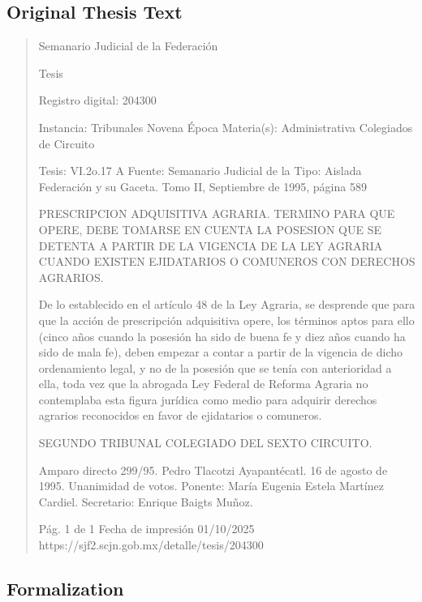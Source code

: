 \documentclass[11pt,a4paper]{article}
\begin{document}
\subsection{Original Thesis Text}

\begin{quote}
                                                   Semanario Judicial de la Federación

                                                  Tesis

 Registro digital: 204300

 Instancia: Tribunales            Novena Época                         Materia(s): Administrativa
 Colegiados de Circuito

 Tesis: VI.2o.17 A                Fuente: Semanario Judicial de la     Tipo: Aislada
                                  Federación y su Gaceta.
                                  Tomo II, Septiembre de 1995,
                                  página 589


PRESCRIPCION ADQUISITIVA AGRARIA. TERMINO PARA QUE OPERE, DEBE TOMARSE EN
CUENTA LA POSESION QUE SE DETENTA A PARTIR DE LA VIGENCIA DE LA LEY AGRARIA
CUANDO EXISTEN EJIDATARIOS O COMUNEROS CON DERECHOS AGRARIOS.


De lo establecido en el artículo 48 de la Ley Agraria, se desprende que para que la acción de
prescripción adquisitiva opere, los términos aptos para ello (cinco años cuando la posesión ha sido
de buena fe y diez años cuando ha sido de mala fe), deben empezar a contar a partir de la vigencia
de dicho ordenamiento legal, y no de la posesión que se tenía con anterioridad a ella, toda vez que
la abrogada Ley Federal de Reforma Agraria no contemplaba esta figura jurídica como medio para
adquirir derechos agrarios reconocidos en favor de ejidatarios o comuneros.

SEGUNDO TRIBUNAL COLEGIADO DEL SEXTO CIRCUITO.


Amparo directo 299/95. Pedro Tlacotzi Ayapantécatl. 16 de agosto de 1995. Unanimidad de votos.
Ponente: María Eugenia Estela Martínez Cardiel. Secretario: Enrique Baigts Muñoz.




                                             Pág. 1 de 1             Fecha de impresión 01/10/2025
  https://sjf2.scjn.gob.mx/detalle/tesis/204300

\end{quote}

\subsection{Formalization}
\end{document}
